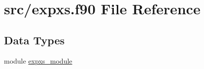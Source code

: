\hypertarget{expxs_8f90}{\section{src/expxs.f90 File Reference}
\label{expxs_8f90}
}
\subsection*{Data Types}
\begin{DoxyCompactItemize}
\item 
module \hyperlink{classexpxs__module}{expxs\-\_\-module}
\end{DoxyCompactItemize}
